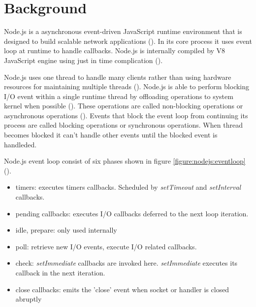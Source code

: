 \chapter{Background\label{background}}
Node.js is a asynchronous event-driven JavaScript runtime environment that is designed to build scalable network applications (\cite{node.jsAbout}).
In its core process it uses event loop at runtime to handle callbacks.
Node.js is internally compiled by V8 JavaScript engine using just in time complication (\cite{nodejsTheV8}).

Node.js uses one thread to handle many clients rather than using hardware resources for maintaining multiple threads (\cite{node.jsOverviewBlockVsNonBlock}).
Node.js is able to perform blocking I/O event within a single runtime thread by offloading operations to system kernel when possible (\cite{node.jsEventLoop}).
These operations are called non-blocking operations or asynchronous operations (\cite{node.jsOverviewBlockVsNonBlock}).
Events that block the event loop from continuing its process are called blocking operations or synchronous operations.
When thread becomes blocked it can't handle other events until the blocked event is handleded.

Node.js event loop consist of six phases shown in figure \ref{figure:nodejs:eventloop} (\cite{node.jsEventLoop}).
\begin{itemize}
    \item
    timers: executes timers callbacks. Scheduled by \textit{setTimeout} and \textit{setInterval} callbacks.
    \item
    pending callbacks: executes I/O callbacks deferred to the next loop iteration.
    \item
    idle, prepare: only used internally
    \item
    poll: retrieve new I/O events, execute I/O related callbacks.
    \item
    check: \textit{setImmediate} callbacks are invoked here. \textit{setImmediate} executes its callback in the next iteration.
    \item
    close callbacks: emits the 'close' event when socket or handler is closed abruptly
\end{itemize}

